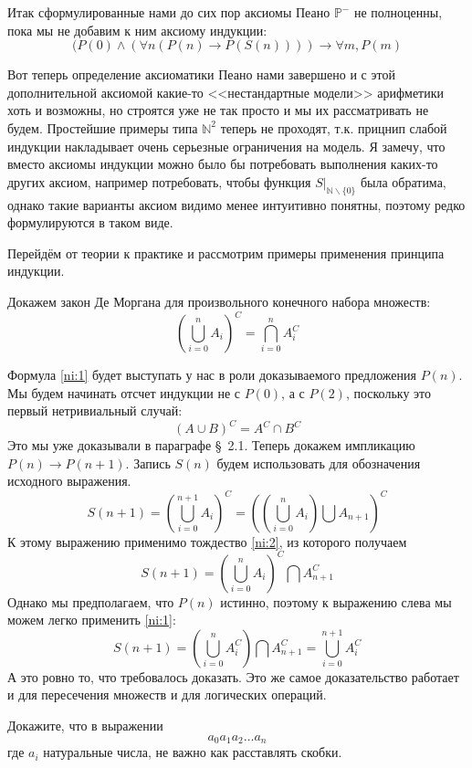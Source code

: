 Итак сформулированные нами до сих пор аксиомы Пеано $\mathbb{P}^-$ не полноценны, пока мы не добавим к ним аксиому индукции:
$$(P(0)\land(\forall n (P(n)\to P(S(n)))) \to \forall m, P(m)$$

Вот теперь определение аксиоматики Пеано нами завершено и с этой дополнительной аксиомой какие-то <<нестандартные модели>> арифметики хоть и возможны, но строятся уже не так просто и мы их рассматривать не будем. Простейшие примеры типа $\mathbb{N}^2$ теперь не проходят, т.к. прицнип слабой индукции накладывает очень серьезные ограничения на модель. Я замечу, что вместо аксиомы индукции можно было бы потребовать выполнения каких-то других аксиом, например потребовать, чтобы функция $S|_{\mathbb{N}\backslash\{0\}}$ была обратима, однако такие варианты аксиом видимо менее интуитивно понятны, поэтому редко формулируются в таком виде.

Перейдём от теории к практике и рассмотрим примеры применения принципа индукции.

\begin{example}
Докажем закон Де Моргана для произвольного конечного набора множеств:
\begin{equation}\label{ni:1}
\left(\bigcup_{i=0}^n A_i\right)^C = \bigcap_{i=0}^n A_i^C
\end{equation}
\end{example}

Формула \eqref{ni:1} будет выступать у нас в роли доказываемого предложения $P(n)$. Мы будем начинать отсчет индукции не с $P(0)$, а с $P(2)$, поскольку это первый нетривиальный случай:
\begin{equation}\label{ni:2}
(A\cup B)^C = A^C \cap B^C
\end{equation}
Это мы уже доказывали в параграфе \S~2.1. Теперь докажем импликацию $P(n)\to P(n + 1)$. Запись $S(n)$ будем использовать для обозначения исходного выражения.
$$S(n+1) = \left( \bigcup_{i=0}^{n+1} A_i \right)^C = \left( \left( \bigcup_{i=0}^n A_i\right) \bigcup A_{n+1}\right)^C$$
К этому выражению применимо тождество \eqref{ni:2}, из которого получаем
$$S(n+1) = \left( \bigcup_{i=0}^n A_i\right)^C \bigcap A_{n+1}^C$$
Однако мы предполагаем, что $P(n)$ истинно, поэтому к выражению слева мы можем легко применить \eqref{ni:1}:
$$S(n+1) = \left(\bigcup_{i=0}^n A_i^C\right) \bigcap A_{n+1}^C = \bigcup_{i=0}^{n+1} A_i^C$$
А это ровно то, что требовалось доказать. Это же самое доказательство работает и для пересечения множеств и для логических операций.

\begin{example}
Докажите, что в выражении
$$a_0 a_1 a_2 \ldots a_n$$
где $a_i$ натуральные числа, не важно как расставлять скобки.
\end{example}


